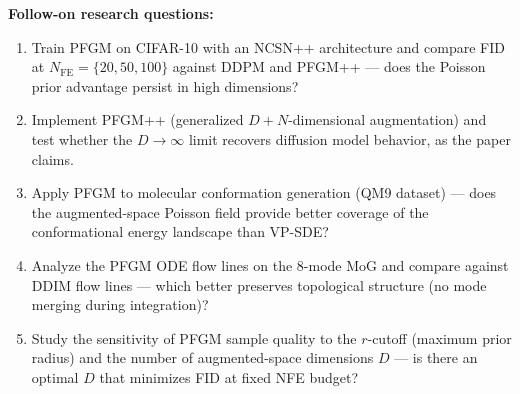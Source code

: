 \noindent\textbf{Follow-on research questions:}
\begin{enumerate}[leftmargin=1.6em,itemsep=0.2em,topsep=0.2em,label=Q\arabic*.]
\item Train PFGM on CIFAR-10 with an NCSN++ architecture and compare FID at $N_\mathrm{FE}=\{20, 50, 100\}$ against DDPM and PFGM++ --- does the Poisson prior advantage persist in high dimensions?
\item Implement PFGM++ (generalized $D+N$-dimensional augmentation) and test whether the $D\to\infty$ limit recovers diffusion model behavior, as the paper claims.
\item Apply PFGM to molecular conformation generation (QM9 dataset) --- does the augmented-space Poisson field provide better coverage of the conformational energy landscape than VP-SDE?
\item Analyze the PFGM ODE flow lines on the 8-mode MoG and compare against DDIM flow lines --- which better preserves topological structure (no mode merging during integration)?
\item Study the sensitivity of PFGM sample quality to the $r$-cutoff (maximum prior radius) and the number of augmented-space dimensions $D$ --- is there an optimal $D$ that minimizes FID at fixed NFE budget?
\end{enumerate}

